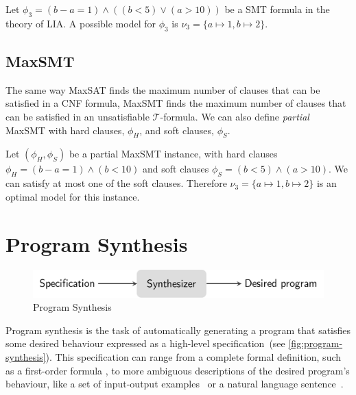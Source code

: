 \begin{example}
Let \(\phi_3 = (b - a = 1) \land ((b<5) \lor (a>10))\) be a \ac{SMT} formula in the theory of LIA. A possible model for \(\phi_3\) is \(\nu_3 = \{a \mapsto 1, b \mapsto 2\}\).
\end{example}


\subsection{\acl{MaxSMT}}

The same way \ac{MaxSAT} finds the maximum number of clauses that can be satisfied in a \ac{CNF} formula, \ac{MaxSMT} finds the maximum number of clauses that can be satisfied in an unsatisfiable \(\mathcal{T}\)-formula.
We can also define \textit{partial} \ac{MaxSMT} with hard clauses, \(\phi_H\), and soft clauses, \(\phi_S\).

\begin{example}
Let \((\phi_{H}, \phi_{S})\) be a partial \ac{MaxSMT} instance, with hard clauses \(\phi_{H}=(b-a=1) \land (b<10)\) and soft clauses \(\phi_{S} = (b<5) \land (a>10)\). We can satisfy at most one of the soft clauses. Therefore \(\nu_3 = \{a \mapsto 1, b \mapsto 2\}\) is an optimal model for this instance.
\end{example}

\section{Program Synthesis} \label{sec:back-ps}
\begin{figure}
    \centering
    \includegraphics[scale=.35]{pictures/program_synthesis.pdf}
    \caption{Program Synthesis}
    \label{fig:program-synthesis}
\end{figure}

Program synthesis is the task of automatically generating a program that satisfies some desired behaviour expressed as a high-level specification~(see \autoref{fig:program-synthesis}).
This specification can range from a complete formal definition, such as a first-order formula \cite{DBLP:conf/ijcai/Green69,DBLP:conf/pldi/GulwaniJTV11}, to more ambiguous descriptions of the desired program's behaviour, like a set of input-output examples~\cite{DBLP:conf/iclr/BalogGBNT17,DBLP:conf/pldi/FengMBD18,DBLP:conf/icse/JhaGST10,DBLP:conf/ijcai/ShawWG75,DBLP:journals/jacm/Summers77,DBLP:conf/aaai/ManshadiGA13,DBLP:conf/ijcai/RazaGM15,DBLP:conf/aaai/MortonHSPS20} or a natural language sentence~\cite{DBLP:conf/icse/DesaiGHJKMRR16,DBLP:journals/pacmpl/Yaghmazadeh0DD17,DBLP:conf/naacl/HuangWSYH18,Regel20,DBLP:conf/aaai/ManshadiGA13,DBLP:conf/ijcai/RazaGM15}.

